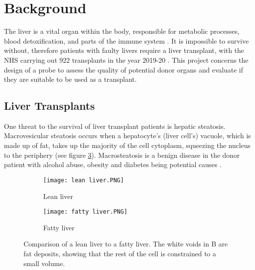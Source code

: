\section{Background}

The liver is a vital organ within the body, responsible for metabolic processes, blood detoxification, and parts of the immune system \cite{liver_background}. It is impossible to survive without, therefore patients with faulty livers require a liver transplant, with the NHS carrying out 922 transplants in the year 2019-20 \cite{nhs_transplants}. This project concerns the design of a probe to assess the quality of potential donor organs and evaluate if they are suitable to be used as a transplant.


\subsection{Liver Transplants}
One threat to the survival of liver transplant patients is hepatic steatosis. Macrovesicular steatosis occurs when a hepatocyte’s (liver cell’s) vacuole, which is made up of fat, takes up the majority of the cell cytoplasm, squeezing the nucleus to the periphery \cite{Imber2002} (see figure \ref{fig: livers}). Macrosteatosis is a benign disease in the donor patient \cite{Imber2002} with alcohol abuse, obesity and diabetes being potential causes \cite{Imber2002}.\\

\begin{figure}[htbp]
	\centering
	\begin{subfigure}[b]{0.4\linewidth}
		\texttt{[image: lean liver.PNG]}
		\caption{Lean liver \cite{Bruno2008}}
		\label{}
	\end{subfigure}
	\begin{subfigure}[b]{0.4\linewidth}
		\texttt{[image: fatty liver.PNG]}
		\caption{Fatty liver \cite{Bruno2008}}
		\label{fig: fatty liver}
	\end{subfigure}
	\caption{Comparison of a lean liver to a fatty liver. The white voids in B are fat deposits, showing that the rest of the cell is constrained to a small volume.}
	\label{fig: livers}
\end{figure}	


